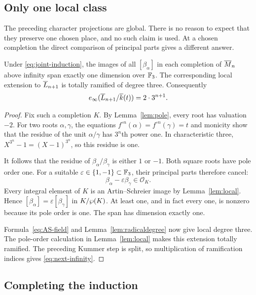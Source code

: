 \subsection{Only one local class}

The preceding character projections are global. There is no reason
to expect that they preserve one chosen place, and no such claim
is used. At a chosen completion the direct comparison of principal
parts gives a different answer.

\begin{proposition}\label{prop:AS-local}
Under \eqref{eq:joint-induction}, the images of all
$[\beta_\alpha]$ in each completion of $\overline{M}_n$ above infinity
span exactly one dimension over $\mathbb{F}_3$. The corresponding local
extension to $\overline{L}_{n+1}$ is totally ramified of degree three.
Consequently
\begin{equation}\label{eq:next-infinity}
 e_\infty(\overline{L}_{n+1}/\overline{k}(t))=2\cdot3^{n+1}.
\end{equation}
\end{proposition}

\begin{proof}
Fix such a completion $K$. By Lemma~\ref{lem:pole}, every
root has valuation $-2$. For two roots $\alpha,\gamma$, the
equations $f^{\circ n}(\alpha)=f^{\circ n}(\gamma)=t$ and
monicity show that the residue of the unit $\alpha/\gamma$
has $3^n$th power one. In characteristic three,
$X^{3^n}-1=(X-1)^{3^n}$, so this residue is one.

It follows that the residue of
$\beta_\alpha/\beta_\gamma$ is either $1$ or $-1$.
Both square roots have pole order one. For a suitable
$\varepsilon\in\{1,-1\}\subset\mathbb{F}_3$, their principal
parts therefore cancel:
\[
 \beta_\alpha-\varepsilon\beta_\gamma\in\mathcal O_K.
\]
Every integral element of $K$ is an Artin--Schreier image by
Lemma~\ref{lem:local}. Hence
$[\beta_\alpha]=\varepsilon[\beta_\gamma]$ in
$K/\wp(K)$. At least one, and in fact every one, is nonzero
because its pole order is one. The span has dimension exactly one.

Formula~\eqref{eq:AS-field} and
Lemma~\ref{lem:radicaldegree} now give local degree three.
The pole-order calculation in Lemma~\ref{lem:local} makes this
extension totally ramified. The preceding Kummer step is split,
so multiplication of ramification indices gives
\eqref{eq:next-infinity}.
\end{proof}

\subsection{Completing the induction}

